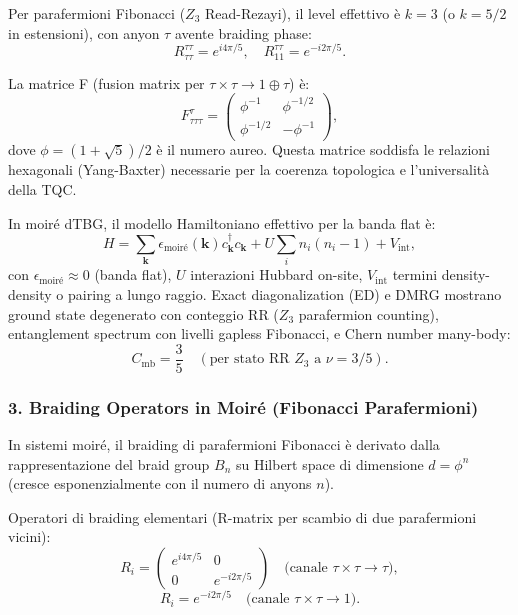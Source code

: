 \documentclass[11pt,a4paper]{article}
\theoremstyle{plain}
\theoremstyle{definition}
\begin{document}
Per parafermioni Fibonacci ($Z_3$ Read-Rezayi), il level effettivo è $k = 3$ (o $k = 5/2$ in estensioni), con anyon $\tau$ avente braiding phase:
\begin{equation}
R^{\tau \tau}_{\tau \tau} = e^{i 4\pi / 5}, \quad R^{\tau \tau}_{1 1} = e^{-i 2\pi / 5}.
\end{equation}

La matrice F (fusion matrix per $\tau \times \tau \to 1 \oplus \tau$) è:
\begin{equation}
F^{\tau}_{\tau \tau \tau} = \begin{pmatrix}
\phi^{-1} & \phi^{-1/2} \\
\phi^{-1/2} & -\phi^{-1}
\end{pmatrix},
\end{equation}
dove $\phi = (1 + \sqrt{5})/2$ è il numero aureo. Questa matrice soddisfa le relazioni hexagonali (Yang-Baxter) necessarie per la coerenza topologica e l'universalità della TQC.

In moiré dTBG, il modello Hamiltoniano effettivo per la banda flat è:
\begin{equation}
H = \sum_{\mathbf{k}} \epsilon_{\mathrm{moiré}}(\mathbf{k}) c^\dagger_{\mathbf{k}} c_{\mathbf{k}} + U \sum_i n_i (n_i - 1) + V_{\mathrm{int}},
\end{equation}
con $\epsilon_{\mathrm{moiré}} \approx 0$ (banda flat), $U$ interazioni Hubbard on-site, $V_{\mathrm{int}}$ termini density-density o pairing a lungo raggio. Exact diagonalization (ED) e DMRG mostrano ground state degenerato con conteggio RR ($Z_3$ parafermion counting), entanglement spectrum con livelli gapless Fibonacci, e Chern number many-body:
\begin{equation}
C_{\mathrm{mb}} = \frac{3}{5} \quad (\text{per stato RR } Z_3 \text{ a } \nu = 3/5).
\end{equation}

\subsubsection{3. Braiding Operators in Moiré (Fibonacci Parafermioni)}

In sistemi moiré, il braiding di parafermioni Fibonacci è derivato dalla rappresentazione del braid group $B_n$ su Hilbert space di dimensione $d = \phi^n$ (cresce esponenzialmente con il numero di anyons $n$).

Operatori di braiding elementari (R-matrix per scambio di due parafermioni vicini):
\begin{equation}
R_i = \begin{pmatrix}
e^{i 4\pi / 5} & 0 \\
0 & e^{-i 2\pi / 5}
\end{pmatrix} \quad \text{(canale } \tau \times \tau \to \tau\text{)},
\end{equation}
\begin{equation}
R_i = e^{-i 2\pi / 5} \quad \text{(canale } \tau \times \tau \to 1\text{)}.
\end{equation}
\end{document}
